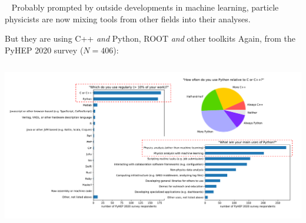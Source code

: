 \documentclass[aspectratio=169]{beamer}
\begin{document}
\begin{frame}{\mbox{ }}
\Large
Probably prompted by outside developments in machine learning, particle physicists are now mixing tools from other fields into their analyses.
\end{frame}

\begin{frame}{But they are using C++ {\it and} Python, ROOT {\it and} other toolkits}
\vspace{0.25 cm}
Again, from the PyHEP 2020 survey ($N = 406$):

\begin{columns}
\includegraphics[width=\linewidth]{PLOTS/pyhep2020-survey-5.pdf}
\end{columns}
\end{frame}
\end{document}
